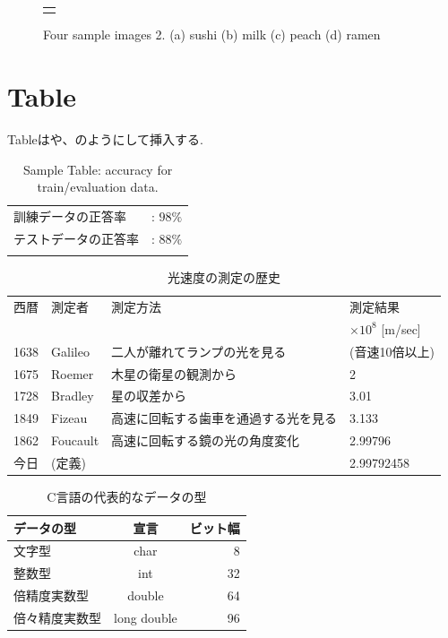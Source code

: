 \begin{figure}[htbp]
\begin{tabular}{c}
\begin{minipage}{0.25\hsize}
				\text{(d)}
			\end{minipage}
		\end{tabular}
		\caption[Four sample images]
		{
			Four sample images 2.
			(a) sushi (b) milk (c) peach (d) ramen
		}
		\label{fig:sample_four_images2}
	\end{figure}
    
\section{Table}
Tableはや、のようにして挿入する.
\begin{table}[htbp]
	\centering
	\caption{Sample Table: accuracy for train/evaluation data.}
	\begin{tabular}{ll}\hline
		 訓練データの正答率&: $98\%$ \\
		 テストデータの正答率&: $88\%$ \\
	\label{tb:sample_table}
	\end{tabular}
\end{table}

\begin{table}[htbp]
 \caption{光速度の測定の歴史}
 \label{tb:SpeedOfLight}
 \centering
  \begin{tabular}{clll}
   \hline
   西暦 & 測定者 & 測定方法 & 測定結果 \\
    & & & $\times 10^8$ [m/sec] \\
   \hline \hline
   1638 & Galileo & 二人が離れてランプの光を見る & (音速10倍以上) \\
   1675 & Roemer & 木星の衛星の観測から & 2 \\
   1728 & Bradley & 星の収差から & 3.01 \\
   1849 & Fizeau & 高速に回転する歯車を通過する光を見る & 3.133 \\
   1862 & Foucault & 高速に回転する鏡の光の角度変化 & 2.99796 \\
   今日 & (定義) & & 2.99792458 \\
   \hline
  \end{tabular}
\end{table}

\begin{table}[htbp]
  \caption{C言語の代表的なデータの型}
  \label{tb:data_type}
  \centering
  \begin{tabular}{lcr}
    \hline
    データの型  & 宣言  &  ビット幅  \\
    \hline \hline
    文字型  & char  & 8 \\
    整数型  & int   & 32 \\
    倍精度実数型  & double  & 64 \\
    倍々精度実数型  &  long double  &  96 \\
    \hline
  \end{tabular}
\end{table}

